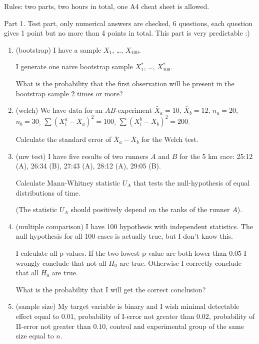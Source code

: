 \documentclass[12pt]{article}
\begin{document}
Rules: two parts, two hours in total, one A4 cheat sheet is allowed. 

\vspace{1cm}

Part 1. Test part, only numerical answers are checked, 6 questions, each question gives 1 point but no more than 4 points in total. 
This part is very predictable :) 

\begin{enumerate}
    \item (bootstrap) I have a sample $X_1$, \ldots, $X_{100}$.
    
    I generate one naive bootstrap sample $X^{*}_{1}$, \ldots, $X^{*}_{100}$. 

    What is the probability that the first observation will be present in the bootstrap sample 2 times or more?

    \item (welch) We have data for an $AB$-experiment $\bar X_a = 10$, $\bar X_b = 12$, 
    $n_a = 20$, $n_b = 30$, $\sum (X_i^a - \bar X_a)^2 = 100$, $\sum (X_i^b - \bar X_b)^2 = 200$.

    Calculate the standard error of $\bar X_a - \bar X_b$ for the Welch test. 
    
    \item (mw test) I have five results of two runners $A$ and $B$ for the 5 km race: 25:12 (A), 26:34 (B), 27:43 (A), 28:12 (A), 29:05 (B).
    
    Calculate Mann-Whitney statistic $U_A$ that tests the null-hypothesis of equal distributions of time. 
    
    (The statistic $U_A$ should positively depend on the ranks of the runner $A$). 

    \item (multiple comparison) I have 100 hypothesis with independent statistics. 
    The null hypothesis for all 100 cases is actually true, but I don't know this. 
    
    I calculate all p-values. 
    If the two lowest p-value are both lower than $0.05$ I wrongly conclude that not all $H_0$ are true. 
    Otherwise I correctly conclude that all $H_0$ are true. 

    What is the probability that I will get the correct conclusion?

    \item (sample size) My target variable is binary and I wish 
    minimal detectable effect equal to $0.01$, probability of I-error  not greater than $0.02$, 
    probability of II-error not greater than $0.10$, control and experimental group of the same size equal to $n$.


\end{enumerate}
\end{document}
